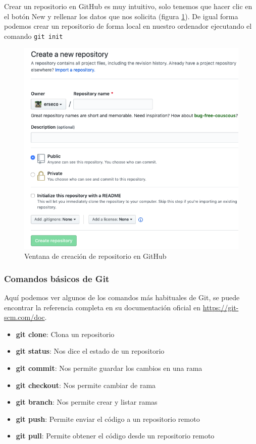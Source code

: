 Crear un repositorio en GitHub es muy intuitivo, solo tenemos que hacer clic en el botón New y rellenar los datos que nos solicita (figura \ref{fig:git2}). De igual forma podemos crear un repositorio de forma local en nuestro ordenador ejecutando el comando \texttt{git init}

\begin{figure}[H]
\centering
\includegraphics[width=1.0\textwidth]{../images/git2}
\caption{Ventana de creación de repositorio en GitHub}
\label{fig:git2}
\end{figure}

\subsubsection{Comandos básicos de Git}

Aquí podemos ver algunos de los comandos más habituales de Git, se puede encontrar la referencia completa en su documentación oficial en \url{https://git-scm.com/doc}.

\begin{itemize}
  \item \textbf{git clone}: Clona un repositorio
  \item \textbf{git status}: Nos dice el estado de un repositorio
  \item \textbf{git commit}: Nos permite guardar los cambios en una rama
  \item \textbf{git checkout}: Nos permite cambiar de rama
  \item \textbf{git branch}: Nos permite crear y listar ramas
  \item \textbf{git push}: Permite enviar el código a un repositorio remoto
  \item \textbf{git pull}: Permite obtener el código desde un repositorio remoto
\end{itemize}


